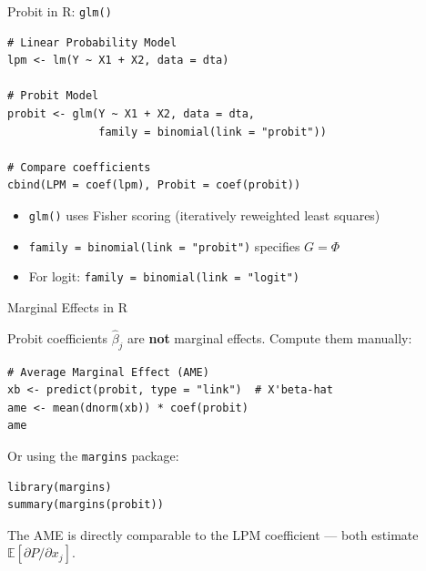 \documentclass[aspectratio=169, handout, t]{beamer}
\numberwithin{equation}{section}
\begin{document}
\begin{frame}[fragile]{Probit in R: \texttt{glm()}}

\begin{lstlisting}
# Linear Probability Model
lpm <- lm(Y ~ X1 + X2, data = dta)

# Probit Model
probit <- glm(Y ~ X1 + X2, data = dta,
              family = binomial(link = "probit"))

# Compare coefficients
cbind(LPM = coef(lpm), Probit = coef(probit))
\end{lstlisting}

\pause

\bigskip

\begin{itemize}
    \item \texttt{glm()} uses Fisher scoring (iteratively reweighted least squares)
    \item \texttt{family = binomial(link = "probit")} specifies $G = \Phi$
    \item For logit: \texttt{family = binomial(link = "logit")}
\end{itemize}

\end{frame}


\begin{frame}[fragile]{Marginal Effects in R}

Probit coefficients $\hat\beta_j$ are \textbf{not} marginal effects. Compute them manually:

\begin{lstlisting}
# Average Marginal Effect (AME)
xb <- predict(probit, type = "link")  # X'beta-hat
ame <- mean(dnorm(xb)) * coef(probit)
ame
\end{lstlisting}

\pause

\bigskip

Or using the \texttt{margins} package:

\begin{lstlisting}
library(margins)
summary(margins(probit))
\end{lstlisting}

\pause

The AME is directly comparable to the LPM coefficient --- both estimate $\mathbb{E}[\partial P / \partial x_j]$.

\end{frame}
\end{document}
